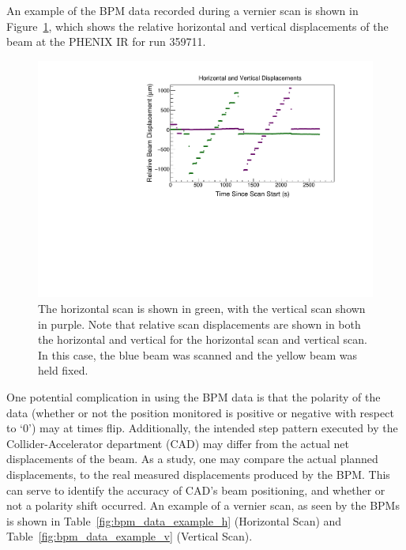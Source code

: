An example of the BPM data recorded during a vernier scan is shown in
Figure~\ref{fig:bpm_data_run359711}, which shows the relative horizontal
and vertical displacements of the beam at the PHENIX IR for run 359711.

\begin{figure}[ht]
  \centering
  \includegraphics[width=0.8\linewidth]{./figures/bpm_data_scan_359711.pdf}
  \caption{
    The horizontal scan is shown in green, with the vertical scan shown in
    purple. Note that relative scan displacements are shown in both the
    horizontal and vertical for the horizontal scan and vertical scan. In this
    case, the blue beam was scanned and the yellow beam was held fixed.
  }
  \label{fig:bpm_data_run359711}
\end{figure}

One potential complication in using the BPM data is that the polarity of the
data (whether or not the position monitored is positive or negative with respect
to `0') may at times flip. Additionally, the intended step pattern executed by
the Collider-Accelerator department (CAD) may differ from the actual net
displacements of the beam. As a study, one may compare the actual planned
displacements, to the real measured displacements produced by the BPM. This can
serve to identify the accuracy of CAD's beam positioning, and whether or not a
polarity shift occurred. An example of a vernier scan, as seen by the BPMs is
shown in Table~\ref{fig:bpm_data_example_h} (Horizontal Scan) and
Table~\ref{fig:bpm_data_example_v} (Vertical Scan).

